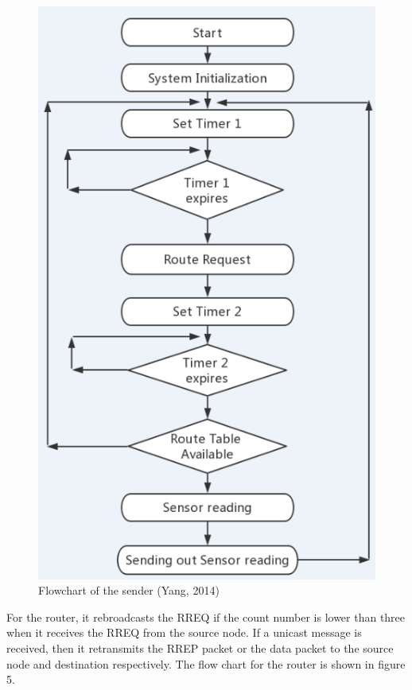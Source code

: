 \documentclass[a4paper]{article}
\begin{document}
\begin{figure}[!htb]
   \centering
   \includegraphics[scale=0.4]{flowchart1}
	\begin{center}
	   \caption{Flowchart of the sender (Yang, 2014)}
	\end{center}	   
    \label{fig:flowchart1}
\end{figure}

For the router, it rebroadcasts the RREQ if the count number is lower than three when it receives the RREQ from the source node. If a unicast message is received, then it retransmits the RREP packet or the data packet to the source node and destination respectively. The flow chart for the router is shown in figure 5.
\end{document}

